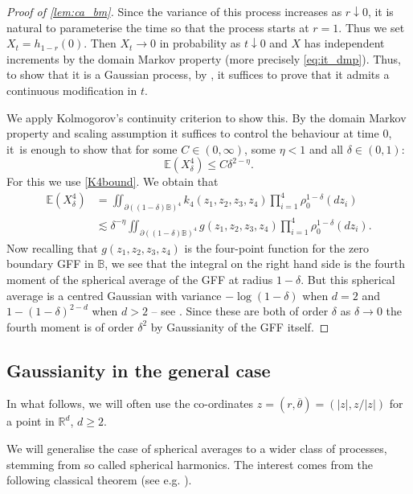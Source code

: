 \documentclass[10pt]{amsart}
\theoremstyle{definition}
\newcommand{\R}{\mathbb{R}}
\newcommand{\E}{\mathbb{E}}
\newcommand{\B}{\mathbb{B}}\let\D\B\let\Ub\B
\let\ol\overline
\begin{document}
\begin{proof}[Proof of \cref{lem:ca_bm}]
Since the variance of this process increases as $r\downarrow 0$, it is natural to parameterise the time so that the process starts at $r = 1$. Thus we set $X_t = h_{1-r}(0)$. Then $X_t\to 0$ in probability as $t\downarrow 0$ and $X$ has independent increments by the domain Markov property (more precisely \eqref{eq:it_dmp}). Thus, to show that it is a Gaussian process, by \cite[Th.\,11.4]{Kallenberg}, it suffices to prove that it admits a continuous modification in $t$.

We apply Kolmogorov's continuity criterion to show this. By the domain Markov property and scaling assumption it suffices to control the behaviour at time $0$, \ie it~is enough to show that for some $C\in (0,\infty)$, some $\eta<1$ and all $\delta\in (0,1)$:
\begin{equation}\label{eqn:required_4mom}
\E(X_\delta^4)\le C\delta^{2-\eta}.
\end{equation}
For this we use \eqref{K4bound}. We obtain that
\begin{align*}
\E(X_\delta^4)&=\iint_{\partial((1-\delta)\B)^4} k_4(z_1,z_2,z_3,z_4) \prod_{i=1}^4 \rho_0^{1-\delta}(dz_i)\\
&\lesssim \delta^{-\eta}\iint_{\partial((1-\delta)\B)^4} g(z_1,z_2,z_3,z_4) \prod_{i=1}^4 \rho_0^{1-\delta}(dz_i).
\end{align*}
Now recalling that $g(z_1,z_2,z_3,z_4)$ is the four-point function for the zero boundary GFF in $\B$, we see that the integral on the right hand side is the fourth moment of the spherical average of the GFF at radius $1-\delta$. But this spherical average is a centred Gaussian with variance $-\log(1-\delta)$ when $d=2$ and $1-(1-\delta)^{2-d}$ when $d>2$ -- see \cite[Eq.\,(13)]{WPgff}. Since these are both of order $\delta$ as $\delta\to 0$ the fourth moment is of order $\delta^2$ by Gaussianity {of the GFF itself}.
\end{proof}

\subsection{Gaussianity in the general case}

 In what follows, we will often use the co-ordinates $z=(r,\ol{\theta})=(|z|,z/|z|)$ for a point in $\R^d$, $d\ge 2$.

We will generalise {the case of spherical averages} to a wider class of processes, stemming from so called spherical harmonics. The interest comes from the following classical theorem (see e.g. \cite[Chap.\,IV]{SteinWeiss}).
\end{document}
